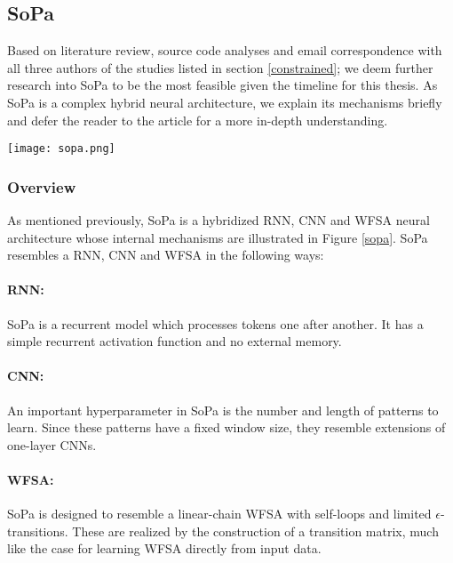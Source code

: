 \subsection{SoPa}

Based on literature review, source code analyses and email correspondence with all three authors of the studies listed in section \ref{constrained}; we deem further research into SoPa to be the most feasible given the timeline for this thesis. As SoPa is a complex hybrid neural architecture, we explain its mechanisms briefly and defer the reader to the article for a more in-depth understanding.

\begin{figure*}
  \centering 
  \texttt{[image: sopa.png]} 
  \caption{Schematic of the SoPa neural architecture \citep{schwartz2018sopa}}
  \label{sopa}
\end{figure*}

\subsubsection{Overview}

As mentioned previously, SoPa is a hybridized RNN, CNN and WFSA neural architecture whose internal mechanisms are illustrated in Figure \ref{sopa}. SoPa resembles a RNN, CNN and WFSA in the following ways:

\paragraph{RNN:} SoPa is a recurrent model which processes tokens one after another. It has a simple recurrent activation function and no external memory.

\paragraph{CNN:} An important hyperparameter in SoPa is the number and length of patterns to learn. Since these patterns have a fixed window size, they resemble extensions of one-layer CNNs.

\paragraph{WFSA:} SoPa is designed to resemble a linear-chain WFSA with self-loops and limited $\epsilon$-transitions. These are realized by the construction of a transition matrix, much like the case for learning WFSA directly from input data.

